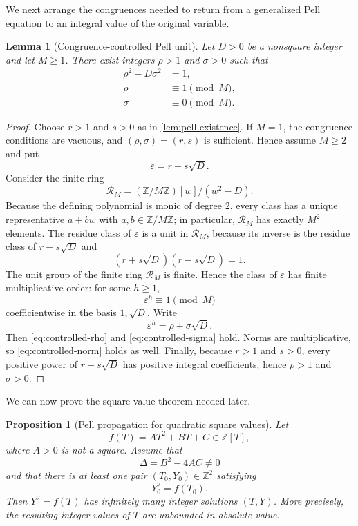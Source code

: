 \documentclass[11pt]{article}
\newtheorem{proposition}[proposition]{Proposition}
\newtheorem{lemma}[lemma]{Lemma}
\theoremstyle{remark}
\newcommand{\Z}{\mathbb Z}
\begin{document}
We next arrange the congruences needed to return from a generalized Pell equation to an integral value of the original variable.

\begin{lemma}[Congruence-controlled Pell unit]\label{lem:congruence-unit}
Let $D>0$ be a nonsquare integer and let $M\ge1$.  There exist integers $\rho>1$ and $\sigma>0$ such that
\begin{align}
 \rho^2-D\sigma^2&=1, \label{eq:controlled-norm}\\
 \rho&\equiv1\pmod M, \label{eq:controlled-rho}\\
 \sigma&\equiv0\pmod M. \label{eq:controlled-sigma}
\end{align}
\end{lemma}

\begin{proof}
Choose $r>1$ and $s>0$ as in \cref{lem:pell-existence}.  If $M=1$, the congruence conditions are vacuous, and $(\rho,\sigma)=(r,s)$ is sufficient.  Hence assume $M\ge2$ and put
\[
 \varepsilon=r+s\sqrt D.
\]
Consider the finite ring
\[
 \mathcal R_M=(\Z/M\Z)[w]/(w^2-D).
\]
Because the defining polynomial is monic of degree $2$, every class has a unique representative $a+bw$ with $a,b\in\Z/M\Z$; in particular, $\mathcal R_M$ has exactly $M^2$ elements.  The residue class of $\varepsilon$ is a unit in $\mathcal R_M$, because its inverse is the residue class of $r-s\sqrt D$ and
\[
 (r+s\sqrt D)(r-s\sqrt D)=1.
\]
The unit group of the finite ring $\mathcal R_M$ is finite.  Hence the class of $\varepsilon$ has finite multiplicative order: for some $h\ge1$,
\[
 \varepsilon^h\equiv1\pmod M
\]
coefficientwise in the basis $1,\sqrt D$.  Write
\[
 \varepsilon^h=\rho+\sigma\sqrt D.
\]
Then \eqref{eq:controlled-rho} and \eqref{eq:controlled-sigma} hold.  Norms are multiplicative, so \eqref{eq:controlled-norm} holds as well.  Finally, because $r>1$ and $s>0$, every positive power of $r+s\sqrt D$ has positive integral coefficients; hence $\rho>1$ and $\sigma>0$.
\end{proof}

We can now prove the square-value theorem needed later.

\begin{proposition}[Pell propagation for quadratic square values]\label{prop:pell-propagation}
Let
\[
 f(T)=AT^2+BT+C\in\Z[T],
\]
where $A>0$ is not a square.  Assume that
\begin{equation}\label{eq:nonzero-discriminant}
 \Delta=B^2-4AC\ne0
\end{equation}
and that there is at least one pair $(T_0,Y_0)\in\Z^2$ satisfying
\begin{equation}\label{eq:initial-square}
 Y_0^2=f(T_0).
\end{equation}
Then $Y^2=f(T)$ has infinitely many integer solutions $(T,Y)$.  More precisely, the resulting integer values of $T$ are unbounded in absolute value.
\end{proposition}
\end{document}
